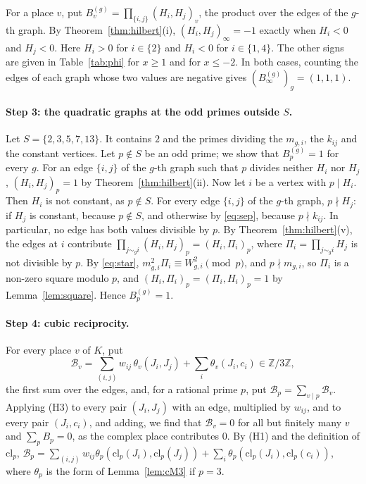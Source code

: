 \documentclass[11pt]{article}
\newcommand{\Z}{\mathbb{Z}}
\begin{document}
For a place $v$, put $B^{(g)}_v=\prod_{\{i,j\}}(H_i,H_j)_v$, the product over the edges of the $g$-th graph. By Theorem~\ref{thm:hilbert}(i), $(H_i,H_j)_\infty=-1$ exactly when $H_i<0$ and $H_j<0$. Here $H_i>0$ for $i\in\{2\}$ and $H_i<0$ for $i\in\{1,\allowbreak 4\}$. The other signs are given in Table~\ref{tab:phi} for $x\geq1$ and for $x\leq-2$. In both cases, counting the edges of each graph whose two values are negative gives $(B^{(g)}_\infty)_g=(1,1,1)$.

\paragraph{Step 3: the quadratic graphs at the odd primes outside $S$.} Let $S=\{2,\allowbreak 3,\allowbreak 5,\allowbreak 7,\allowbreak 13\}$. It contains $2$ and the primes dividing the $m_{g,i}$, the $k_{ij}$ and the constant vertices. Let $p\notin S$ be an odd prime; we show that $B^{(g)}_p=1$ for every $g$. For an edge $\{i,j\}$ of the $g$-th graph such that $p$ divides neither $H_i$ nor $H_j$, $(H_i,H_j)_p=1$ by Theorem~\ref{thm:hilbert}(ii). Now let $i$ be a vertex with $p\mid H_i$. Then $H_i$ is not constant, as $p\notin S$. For every edge $\{i,j\}$ of the $g$-th graph, $p\nmid H_j$: if $H_j$ is constant, because $p\notin S$, and otherwise by \eqref{eq:sep}, because $p\nmid k_{ij}$. In particular, no edge has both values divisible by $p$. By Theorem~\ref{thm:hilbert}(v), the edges at $i$ contribute $\prod_{j\sim_g i}(H_i,H_j)_p=(H_i,\Pi_i)_p$, where $\Pi_i=\prod_{j\sim_g i}H_j$ is not divisible by $p$. By \eqref{eq:star}, $m_{g,i}^2\Pi_i\equiv W_{g,i}^2\pmod p$, and $p\nmid m_{g,i}$, so $\Pi_i$ is a non-zero square modulo $p$, and $(H_i,\Pi_i)_p=(\Pi_i,H_i)_p=1$ by Lemma~\ref{lem:square}. Hence $B^{(g)}_p=1$.

\paragraph{Step 4: cubic reciprocity.} For every place $v$ of $K$, put
\begin{equation}\label{eq:cB}
\mathcal B_v=\sum_{(i,j)}w_{ij}\,\theta_v(J_i,J_j)+\sum_i\theta_v(J_i,c_i)\in\Z/3\Z,
\end{equation}
the first sum over the edges, and, for a rational prime $p$, put $\mathcal B_p=\sum_{v\mid p}\mathcal B_v$. Applying (H3) to every pair $(J_i,J_j)$ with an edge, multiplied by $w_{ij}$, and to every pair $(J_i,c_i)$, and adding, we find that $\mathcal B_v=0$ for all but finitely many $v$ and $\sum_pB_p=0$, as the complex place contributes $0$. By (H1) and the definition of $\mathrm{cl}_p$, $\mathcal B_p=\sum_{(i,j)}w_{ij}\theta_p(\mathrm{cl}_p(J_i),\mathrm{cl}_p(J_j))+\sum_i\theta_p(\mathrm{cl}_p(J_i),\mathrm{cl}_p(c_i))$, where $\theta_p$ is the form of Lemma~\ref{lem:cM3} if $p=3$.
\end{document}
